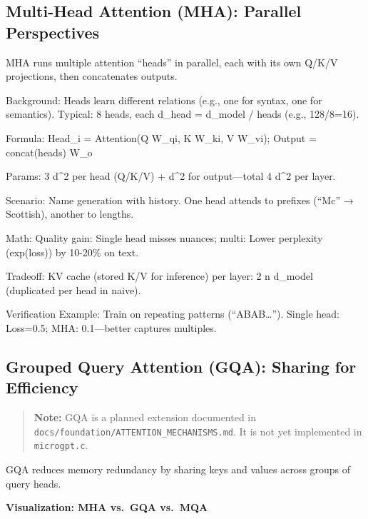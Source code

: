 \documentclass[
]{article}
\begin{document}
\subsection{Multi-Head Attention (MHA): Parallel
Perspectives}\label{multi-head-attention-mha-parallel-perspectives}

MHA runs multiple attention ``heads'' in parallel, each with its own
Q/K/V projections, then concatenates outputs.

Background: Heads learn different relations (e.g., one for syntax, one
for semantics). Typical: 8 heads, each d\_head = d\_model / heads (e.g.,
128/8=16).

Formula: Head\_i = Attention(Q W\_qi, K W\_ki, V W\_vi); Output =
concat(heads) W\_o

Params: 3 d\^{}2 per head (Q/K/V) + d\^{}2 for output---total 4 d\^{}2
per layer.

Scenario: Name generation with history. One head attends to prefixes
(``Mc'' → Scottish), another to lengths.

Math: Quality gain: Single head misses nuances; multi: Lower perplexity
(exp(loss)) by 10-20\% on text.

Tradeoff: KV cache (stored K/V for inference) per layer: 2 n d\_model
(duplicated per head in naive).

Verification Example: Train on repeating patterns (``ABAB\ldots{}'').
Single head: Loss=0.5; MHA: 0.1---better captures multiples.

\subsection{Grouped Query Attention (GQA): Sharing for
Efficiency}\label{grouped-query-attention-gqa-sharing-for-efficiency}

\begin{quote}
\textbf{Note:} GQA is a planned extension documented in
\texttt{docs/foundation/ATTENTION\_MECHANISMS.md}. It is not yet
implemented in \texttt{microgpt.c}.
\end{quote}

GQA reduces memory redundancy by sharing keys and values across groups
of query heads.

\textbf{Visualization: MHA vs.~GQA vs.~MQA}
\end{document}

